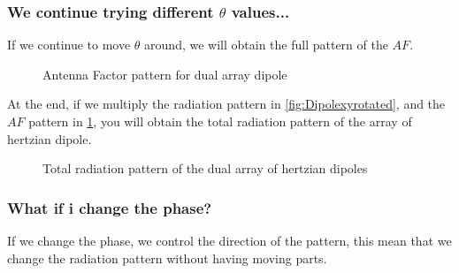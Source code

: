 \subsubsection*{We continue trying different $\theta$ values...}
If we continue to move $\theta$ around, we will obtain the full pattern of the $AF$.
\begin{figure}[H]
    \begin{center}
        \caption{Antenna Factor pattern for dual array dipole}\label{fig:AFhertzian}
    \end{center}
\end{figure}
At the end, if we multiply the radiation pattern in \cref{fig:Dipolexyrotated}, and the $AF$ pattern in \cref{fig:AFhertzian}, you will obtain the total radiation pattern of the array of hertzian dipole.
\begin{figure}[H]
    \begin{center}
        \caption{Total radiation pattern of the dual array of hertzian dipoles}\label{fig:tot_radiation_array}
    \end{center}
\end{figure}
\subsubsection*{What if i change the phase?}
If we change the phase, we control the direction of the pattern, this mean that we change the radiation pattern without having moving parts.
